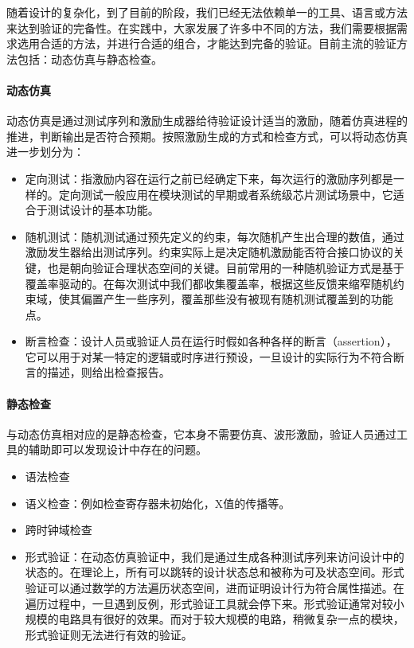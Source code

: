 \begin{center}
随着设计的复杂化，到了目前的阶段，我们已经无法依赖单一的工具、语言或方法来达到验证的完备性。在实践中，大家发展了许多中不同的方法，我们需要根据需求选用合适的方法，并进行合适的组合，才能达到完备的验证。目前主流的验证方法包括：动态仿真与静态检查。

\paragraph{动态仿真}

动态仿真是通过测试序列和激励生成器给待验证设计适当的激励，随着仿真进程的推进，判断输出是否符合预期。按照激励生成的方式和检查方式，可以将动态仿真进一步划分为：
\begin{itemize}
	\item 定向测试：指激励内容在运行之前已经确定下来，每次运行的激励序列都是一样的。定向测试一般应用在模块测试的早期或者系统级芯片测试场景中，它适合于测试设计的基本功能。
	\item 随机测试：随机测试通过预先定义的约束，每次随机产生出合理的数值，通过激励发生器给出测试序列。约束实际上是决定随机激励能否符合接口协议的关键，也是朝向验证合理状态空间的关键。目前常用的一种随机验证方式是基于覆盖率驱动的。在每次测试中我们都收集覆盖率，根据这些反馈来缩窄随机约束域，使其偏置产生一些序列，覆盖那些没有被现有随机测试覆盖到的功能点。
	\item 断言检查：设计人员或验证人员在运行时假如各种各样的断言（assertion），它可以用于对某一特定的逻辑或时序进行预设，一旦设计的实际行为不符合断言的描述，则给出检查报告。
\end{itemize}

\paragraph{静态检查}

与动态仿真相对应的是静态检查，它本身不需要仿真、波形激励，验证人员通过工具的辅助即可以发现设计中存在的问题。

\begin{itemize}
	\item 语法检查
	\item 语义检查：例如检查寄存器未初始化，X值的传播等。
	\item 跨时钟域检查
	\item 形式验证：在动态仿真验证中，我们是通过生成各种测试序列来访问设计中的状态的。在理论上，所有可以跳转的设计状态总和被称为可及状态空间。形式验证可以通过数学的方法遍历状态空间，进而证明设计行为符合属性描述。在遍历过程中，一旦遇到反例，形式验证工具就会停下来。形式验证通常对较小规模的电路具有很好的效果。而对于较大规模的电路，稍微复杂一点的模块，形式验证则无法进行有效的验证。
\end{itemize}


\end{center}

